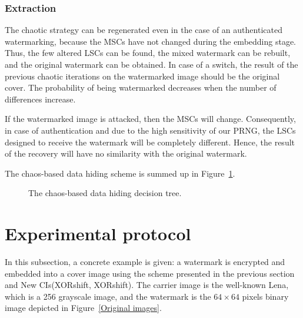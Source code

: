 \subsubsection{Extraction}

The chaotic strategy can be regenerated even in the case of an authenticated watermarking, because the MSCs have not changed during the embedding stage. Thus, the few altered LSCs can be found, the mixed watermark can be rebuilt, and the original watermark can be obtained. In case of a switch, the result of the previous chaotic iterations on the watermarked image should be the original cover. The probability of being watermarked decreases when the number of differences increase.

If the watermarked image is attacked, then the MSCs will change. Consequently, in case of authentication and due to the high sensitivity of our PRNG, the LSCs designed to receive the watermark will be completely different. Hence, the result of the recovery will have no similarity with the original watermark.

The chaos-based data hiding scheme is summed up in Figure~\ref{fig:organigramme}.

\begin{figure}[htb]
\centerline{}
\caption{The chaos-based data hiding decision tree.}
\label{fig:organigramme}
\end{figure}



\section{Experimental protocol}
In this subsection, a concrete example is given: a watermark is encrypted and embedded into a cover image using the scheme presented in the previous section and New CIs(XORshift, XORshift). The carrier image is the well-known Lena, which is a 256 grayscale image, and the watermark is the $64\times 64$ pixels binary image depicted in Figure~\ref{Original images}.


